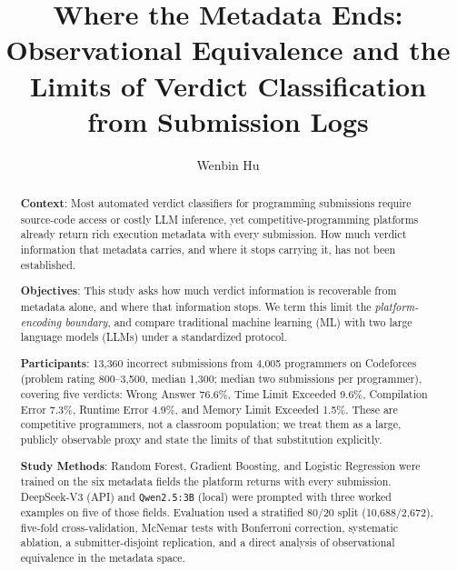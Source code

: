 \documentclass[acmsmall]{acmart}
\title{Where the Metadata Ends: Observational Equivalence and the Limits of Verdict Classification from Submission Logs}
\author{Wenbin Hu}
\affiliation{
 \institution{School of Computer Science, Xijing University}
 \city{Xi'an}
 \country{China}
}
\begin{document}
\begin{abstract}

\par\textbf{Context}: Most automated verdict classifiers for programming submissions require source-code access or costly LLM inference, yet competitive-programming platforms already return rich execution metadata with every submission. How much verdict information that metadata carries, and where it stops carrying it, has not been established.

\par\textbf{Objectives}: This study asks how much verdict information is recoverable from metadata alone, and where that information stops. We term this limit the \emph{platform-encoding boundary}, and compare traditional machine learning (ML) with two large language models (LLMs) under a standardized protocol.

\par\textbf{Participants}: 13,360 incorrect submissions from 4,005 programmers on Codeforces (problem rating 800--3,500, median 1,300; median two submissions per programmer), covering five verdicts: Wrong Answer 76.6\%, Time Limit Exceeded 9.6\%, Compilation Error 7.3\%, Runtime Error 4.9\%, and Memory Limit Exceeded 1.5\%. These are competitive programmers, not a classroom population; we treat them as a large, publicly observable proxy and state the limits of that substitution explicitly.

\par\textbf{Study Methods}: Random Forest, Gradient Boosting, and Logistic Regression were trained on the six metadata fields the platform returns with every submission. DeepSeek-V3 (API) and \texttt{Qwen2.5:3B} (local) were prompted with three worked examples on five of those fields. Evaluation used a stratified 80/20 split (10,688/2,672), five-fold cross-validation, McNemar tests with Bonferroni correction, systematic ablation, a submitter-disjoint replication, and a direct analysis of observational equivalence in the metadata space.


\end{abstract}
\end{document}

